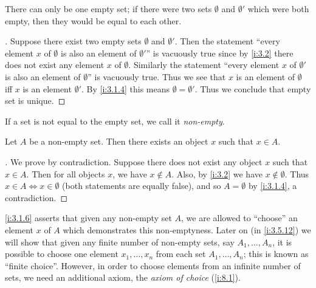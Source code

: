 \begin{ac}\label{i:ac:3.1.2}
  There can only be one empty set;
  if there were two sets \(\emptyset\) and \(\emptyset'\) which were both empty, then they would be equal to each other.
\end{ac}

\begin{proof}[]
  Suppose there exist two empty sets \(\emptyset\) and \(\emptyset'\).
  Then the statement ``every element \(x\) of \(\emptyset\) is also an element of \(\emptyset'\)'' is vacuously true since by \cref{i:3.2} there does not exist any element \(x\) of \(\emptyset\).
  Similarly the statement ``every element \(x\) of \(\emptyset'\) is also an element of \(\emptyset\)'' is vacuously true.
  Thus we see that \(x\) is an element of \(\emptyset\) iff \(x\) is an element \(\emptyset'\).
  By \cref{i:3.1.4} this means \(\emptyset = \emptyset'\).
  Thus we conclude that empty set is unique.
\end{proof}

\begin{note}
  If a set is not equal to the empty set, we call it \emph{non-empty}.
\end{note}

\setcounter{thm}{5}
\begin{lem}\label{i:3.1.6}
  Let \(A\) be a non-empty set.
  Then there exists an object \(x\) such that \(x \in A\).
\end{lem}

\begin{proof}[]
  We prove by contradiction.
  Suppose there does not exist any object \(x\) such that \(x \in A\).
  Then for all objects \(x\), we have \(x \notin A\).
  Also, by \cref{i:3.2} we have \(x \notin \emptyset\).
  Thus \(x \in A \iff x \in \emptyset\) (both statements are equally false), and so \(A = \emptyset\) by \cref{i:3.1.4}, a contradiction.
\end{proof}

\begin{rmk}\label{i:3.1.7}
  \cref{i:3.1.6} asserts that given any non-empty set \(A\), we are allowed to ``choose'' an element \(x\) of \(A\) which demonstrates this non-emptyness.
  Later on (in \cref{i:3.5.12}) we will show that given any finite number of non-empty sets, say \(A_1, \dots, A_n\), it is possible to choose one element \(x_1, \dots, x_n\) from each set \(A_1, \dots, A_n\);
  this is known as ``finite choice''.
  However, in order to choose elements from an infinite number of sets, we need an additional axiom, the \emph{axiom of choice} (\cref{i:8.1}).
\end{rmk}

